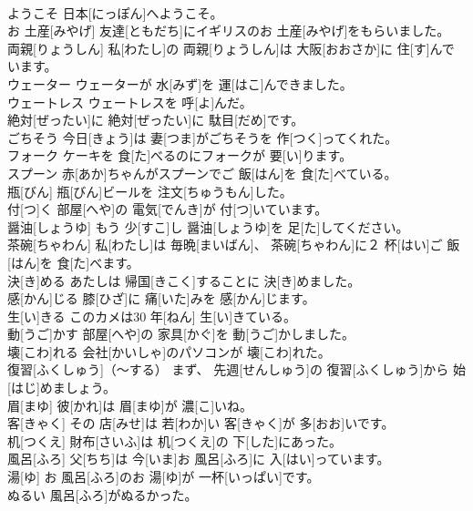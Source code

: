 \documentclass[8pt]{extreport}
\begin{document}
\begin{CJK}{UTF8}{min}
\\	ようこそ	日本[にっぽん]へようこそ。		
\\	お 土産[みやげ]	友達[ともだち]にイギリスのお 土産[みやげ]をもらいました。		
\\	両親[りょうしん]	私[わたし]の 両親[りょうしん]は 大阪[おおさか]に 住[す]んでいます。		
\\	ウェーター	ウェーターが 水[みず]を 運[はこ]んできました。		
\\	ウェートレス	ウェートレスを 呼[よ]んだ。		
\\	絶対[ぜったい]に	絶対[ぜったい]に 駄目[だめ]です。		
\\	ごちそう	今日[きょう]は 妻[つま]がごちそうを 作[つく]ってくれた。		
\\	フォーク	ケーキを 食[た]べるのにフォークが 要[い]ります。		
\\	スプーン	赤[あか]ちゃんがスプーンでご 飯[はん]を 食[た]べている。		
\\	瓶[びん]	瓶[びん]ビールを 注文[ちゅうもん]した。		
\\	付[つ]く	部屋[へや]の 電気[でんき]が 付[つ]いています。		
\\	醤油[しょうゆ]	もう 少[すこ]し 醤油[しょうゆ]を 足[た]してください。		
\\	茶碗[ちゃわん]	私[わたし]は 毎晩[まいばん]、 茶碗[ちゃわん]に２ 杯[はい]ご 飯[はん]を 食[た]べます。		
\\	決[き]める	あたしは 帰国[きこく]することに 決[き]めました。		
\\	感[かん]じる	膝[ひざ]に 痛[いた]みを 感[かん]じます。		
\\	生[い]きる	このカメは30 年[ねん] 生[い]きている。		
\\	動[うご]かす	部屋[へや]の 家具[かぐ]を 動[うご]かしました。		
\\	壊[こわ]れる	会社[かいしゃ]のパソコンが 壊[こわ]れた。		
\\	復習[ふくしゅう]（～する）	まず、 先週[せんしゅう]の 復習[ふくしゅう]から 始[はじ]めましょう。		
\\	眉[まゆ]	彼[かれ]は 眉[まゆ]が 濃[こ]いね。		
\\	客[きゃく]	その 店[みせ]は 若[わか]い 客[きゃく]が 多[おお]いです。		
\\	机[つくえ]	財布[さいふ]は 机[つくえ]の 下[した]にあった。		
\\	風呂[ふろ]	父[ちち]は 今[いま]お 風呂[ふろ]に 入[はい]っています。		
\\	湯[ゆ]	お 風呂[ふろ]のお 湯[ゆ]が 一杯[いっぱい]です。		
\\	ぬるい	風呂[ふろ]がぬるかった。		

\end{CJK}
\end{document}
